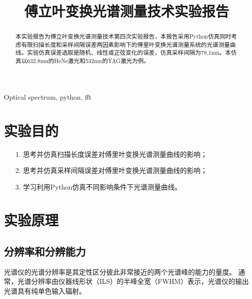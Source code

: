 \documentclass[conference]{IEEEtran}
\begin{document}
\title{傅立叶变换光谱测量技术实验报告}

\author{
}




\maketitle

\begin{abstract}
    本实验报告为傅立叶变换光谱测量技术第四次实验报告，本报告采用Python仿真同时考虑有限扫描长度和采样间隔误差两因素影响下的傅里叶变换光谱测量系统的光谱测量曲线。实验仿真误差选取是随机、线性或正弦变化的误差，仿真采样间隔为79.1nm。本仿真以632.8nm的HeNe激光和532nm的YAG激光为例。
\end{abstract}

\begin{IEEEkeywords}
    Optical spectrum, python, fft
\end{IEEEkeywords}

\section{实验目的}
\begin{itemize}
    \item[1.] 思考并仿真扫描长度误差对傅里叶变换光谱测量曲线的影响；
    \item[2.] 思考并仿真采样间隔误差对傅里叶变换光谱测量曲线的影响；
    \item[3.] 学习利用Python仿真不同影响条件下光谱测量曲线。 
\end{itemize} 

\section{实验原理}
\subsection{分辨率和分辨能力}
光谱仪的光谱分辨率是其定性区分彼此非常接近的两个光谱峰的能力的量度。 通常，光谱分辨率由仪器线形状（ILS）的半峰全宽（FWHM）表示，光谱仪的输出光谱具有纯单色输入辐射。
\end{document}
